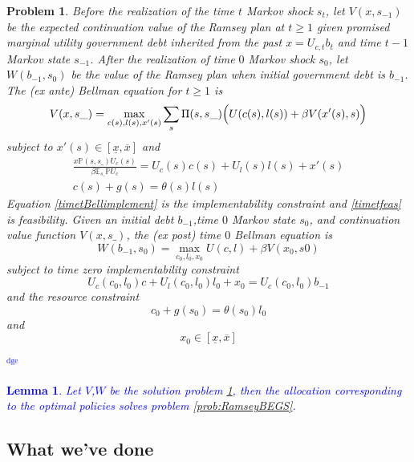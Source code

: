 \documentclass[12pt]{article}
\newcommand{\dge}[1]{\textcolor{blue}{$^{\textrm{dge}}${#1}}}
\newcommand{\tjs}[1]{\textcolor{red}{$^{\textrm{tjs}}${#1}}}
\newcommand{\EE}{\mathbb E}
\newtheorem{lemma}[theorem]{Lemma}
\newtheorem{problem}[theorem]{Problem}
\begin{document}
\begin{problem}\label{prob:RamseyBellman}
Before the realization of the time $t$ Markov shock $s_t$, let   $V(x, s_{-1})$ be the {\em expected} continuation value of the Ramsey plan at $t \geq 1$  given promised marginal utility government debt inherited
from the past $x = U_{c,t} b_t $ and time $t-1$ Markov state $s_{-1}$.
After the realization of time $0$ Markov shock $s_0$, let $W(b_{-1},s_0)$ be the value of the Ramsey plan when initial
government debt is $b_{-1}$. %
The (\textit{ex ante}) Bellman equation for $t\geq1$  is
	\begin{equation}\label{eqn:Bellman1}
		V(x,s\_) = \max_{c(s),l(s),x'(s)} \sum_s \Pi(s,s\_)\Bigl(U(c(s),l(s)) + \beta V(x'(s),s)\Bigr)
	\end{equation}
subject to $x'(s)\in [\underline x,\overline x]$ and
	\begin{align}
		\frac{x \mathbb{P}(s,s\_) U_c(s)}{\beta\EE_{s\_} \mathbb{P}U_c} =U_c(s)c(s)+U_l(s)l(s) + x'(s) \label{timetBellimplement}\\
		c(s) + g(s) = \theta(s)l(s) \label{timetfeas}
	\end{align}
Equation \eqref{timetBellimplement} is the implementability constraint and \eqref{timetfeas} is feasibility.
	Given an initial  debt $b_{-1}$,time $0$ Markov state $s_0$,  and continuation value function $V(x,s\_)$, the (\textit{ex post}) time $0$ Bellman equation is
	\begin{equation}\label{eqn:Bellman0}
		W(b_{-1},s_0) = \max_{c_{0},l_0,x_{0}} U(c,l) +\beta V(x_0,s0)
	\end{equation} subject to  time zero implementability constraint
	\[
		U_{c}(c_0,l_0)c + U_l(c_0,l_0) l_0 + x_0 = U_c(c_0,l_0) b_{-1}
	\]and  the resource constraint
	\[
		c_0+ g(s_0) = \theta(s_0) l_0
	\]and
	\[
		x_0 \in [\underline x,\overline x]
	\]
\end{problem}
\dge{
\begin{lemma}  Let $V$,$W$ be the solution problem \ref{prob:RamseyBellman}, then the allocation corresponding to the optimal policies solves problem \ref{prob:RamseyBEGS}. 
\end{lemma}
}
\subsection{What we've done}
\end{document}
